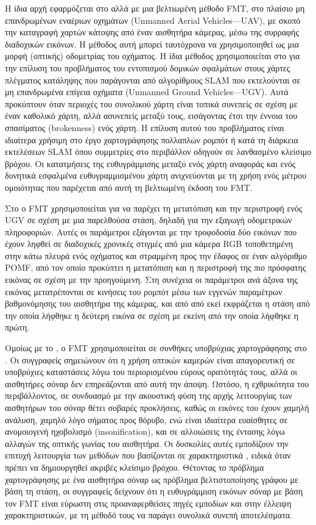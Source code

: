 Η ίδια αρχή εφαρμόζεται στο \cite{Bulow2009} αλλά με μια βελτιωμένη μέθοδο FMT,
στο πλαίσιο μη επανδρωμένων εναέριων οχημάτων (Unmanned Aerial Vehicles---UAV),
με σκοπό την καταγραφή χαρτών κάτοψης από έναν αισθητήρα κάμερας, μέσω της
συρραφής διαδοχικών εικόνων. Η μέθοδος αυτή μπορεί ταυτόχρονα να χρησιμοποιηθεί
ως μια μορφή (οπτικής) οδομετρίας του οχήματος. Η ίδια μέθοδος χρησιμοποιείται
στο \cite{Birk2010} για την επίλυση του προβλήματος του εντοπισμού δομικών
σφαλμάτων στους χάρτες πλέγματος κατάληψης που παράγονται από αλγορίθμους SLAM
που εκτελούνται σε μη επανδρωμένα επίγεια οχήματα (Unmanned Ground
Vehicles---UGV). Αυτά προκύπτουν όταν περιοχές του συνολικού χάρτη είναι τοπικά
συνεπείς σε σχέση με έναν καθολικό χάρτη, αλλά ασυνεπείς μεταξύ τους,
εισάγοντας έτσι την έννοια του σπασίματος (brokenness) ενός χάρτη. Η επίλυση
αυτού του προβλήματος είναι ιδιαίτερα χρήσιμη στο έργο χαρτογράφησης πολλαπλών
ρομπότ ή κατά τη διάρκεια εκτελέσεων SLAM όπου συμμετρίες στο περιβάλλον
οδηγούν σε λανθασμένο κλείσιμο βρόχου. Οι κατατμήσεις της ευθυγράμμισης μεταξύ
ενός χάρτη αναφοράς και ενός δυνητικά εσφαλμένα ευθυγραμμισμένου χάρτη
ανιχνεύονται με τη χρήση ενός μέτρου ομοιότητας που παρέχεται από αυτή τη
βελτιωμένη έκδοση του FMT.

Στο \cite{Kazik2011} ο FMT χρησιμοποιείται για να παρέχει τη μετατόπιση και την
περιστροφή ενός UGV σε σχέση με μια παρελθούσα στάση, δηλαδή για την εξαγωγή
οδομετρικών πληροφοριών. Αυτές οι παράμετροι εξάγονται με την τροφοδοσία δύο
εικόνων που έχουν ληφθεί σε διαδοχικές χρονικές στιγμές από μια κάμερα RGB
τοποθετημένη στην κάτω πλευρά ενός οχήματος και στραμμένη προς την έδαφος σε
έναν αλγόριθμο POMF, από τον οποίο προκύπτει η μετατόπιση και η περιστροφή της
πιο πρόσφατης εικόνας σε σχέση με την προηγούμενη. Στη συνέχεια οι παράμετροι
ανά άξονα της εικόνας μετατρέπονται σε κινήσεις του ρομπότ μέσω των εγγενών
παραμέτρων βαθμονόμησης του αισθητήρα της κάμερας, και από από εκεί εκφράζεται
η στάση από την οποία λήφθηκε η δεύτερη εικόνα σε σχέση με εκείνη από την οποία
λήφθηκε η πρώτη.

Ομοίως με το \cite{Bulow2010}, ο FMT χρησιμοποιείται σε συνθήκες υποβρύχιας
χαρτογράφησης στο \cite{Hurtos2012}. Οι συγγραφείς σημειώνουν ότι η χρήση
οπτικών καμερών είναι απαγορευτική σε υποβρύχιες καταστάσεις λόγω του
περιορισμένου εύρους ορατότητάς τους, αλλά οι αισθητήρες σόναρ δεν επηρεάζονται
από αυτή την άποψη. Ωστόσο, η εχθρικότητα του περιβάλλοντος, σε συνδυασμό με
την ακουστική φύση της αρχής λειτουργίας των αισθητήρων του σόναρ θέτει σοβαρές
προκλήσεις, καθώς οι εικόνες του έχουν χαμηλή ανάλυση, χαμηλό λόγο σήματος προς
θόρυβο, ενώ είναι ιδιαίτερα ευαίσθητες σε ανομοιογενή ηχοβολισμό
(insonification), και σε αλλοιώσεις της έντασης λόγω αλλαγών της οπτικής γωνίας
του αισθητήρα. Οι δυσκολίες αυτές εμποδίζουν την επιτυχή λειτουργία των μεθόδων
που βασίζονται σε χαρακτηριστικά \cite{Kim2005,Lowe2004}, ειδικά όταν πρέπει
να δημιουργηθεί ακριβές κλείσιμο βρόχου. Θέτοντας το πρόβλημα χαρτογράφησης
με ένα αισθητήρα σόναρ ως πρόβλημα βελτιστοποίησης γράφου με βάση τη στάση, οι
συγγραφείς δείχνουν ότι η ευθυγράμμιση εικόνων σόναρ με βάση τον FMT είναι
εύρωστη στις προαναφερθείσες πηγές εμποδίων και στην έλλειψη χαρακτηριστικών,
με τη μέθοδό τους να παράγει συνολικά συνεπή αποτελέσματα.

